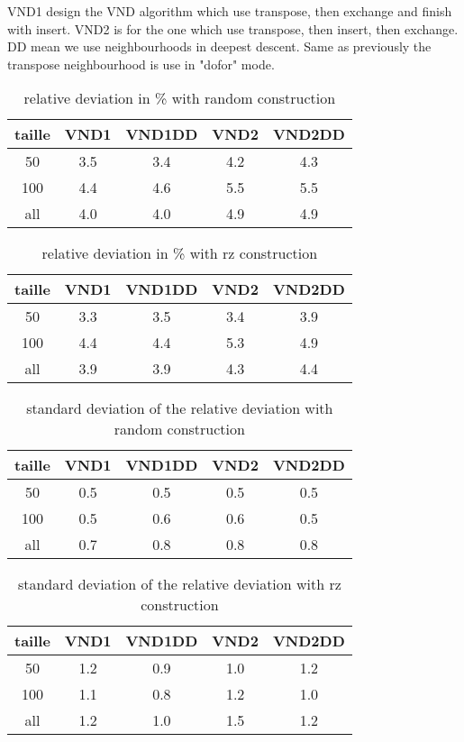 \documentclass[12pt,a4paper]{article}
\begin{document}
VND1 design the VND algorithm which use transpose, then exchange and finish with insert. VND2 is for the one which use transpose, then insert, then exchange. DD mean we use neighbourhoods in deepest descent. Same as previously the transpose neighbourhood is use in "dofor" mode.

\begin{table}[!h]
\centering
\begin{tabular}{|*{5}{c|}}
  \hline
  taille & VND1 & VND1DD & VND2 & VND2DD\\
  \hline
  50 & 3.5 & 3.4 & 4.2 & 4.3 \\ 
  100 & 4.4 & 4.6 & 5.5 & 5.5 \\
  all & 4.0 & 4.0 & 4.9 & 4.9 \\
  \hline
\end{tabular}
\caption{relative deviation in \% with random construction}
\end{table}

\begin{table}[!h]
\centering
\begin{tabular}{|*{5}{c|}}
  \hline
  taille & VND1 & VND1DD & VND2 & VND2DD\\
  \hline
  50 & 3.3 & 3.5 & 3.4 & 3.9 \\ 
  100 & 4.4 & 4.4 & 5.3 & 4.9 \\
  all & 3.9 & 3.9 & 4.3 & 4.4 \\
  \hline
\end{tabular}
\caption{relative deviation in \% with rz construction}
\end{table}

\begin{table}[!h]
\centering
\begin{tabular}{|*{5}{c|}}
  \hline
  taille & VND1 & VND1DD & VND2 & VND2DD\\
  \hline
  50 & 0.5 & 0.5 & 0.5 & 0.5 \\ 
  100 & 0.5 & 0.6 & 0.6 & 0.5 \\
  all & 0.7 & 0.8 & 0.8 & 0.8 \\
  \hline
\end{tabular}
\caption{standard deviation of the relative deviation with random construction}
\end{table}

\begin{table}[!h]
\centering
\begin{tabular}{|*{5}{c|}}
  \hline
  taille & VND1 & VND1DD & VND2 & VND2DD\\
  \hline
  50 & 1.2 & 0.9 & 1.0 & 1.2 \\ 
  100 & 1.1 & 0.8 & 1.2 & 1.0 \\
  all & 1.2 & 1.0 & 1.5 & 1.2 \\
  \hline
\end{tabular}
\caption{standard deviation of the relative deviation with rz construction}
\end{table}
\end{document}
